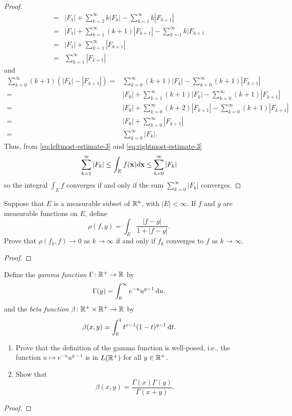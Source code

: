 \begin{proof}
\begin{equation}
\begin{aligned}
={}&|F_1|+\sum_{k=2}^\infty k|F_k|-\sum_{k=1}^\infty k|F_{k+1}|\\
={}&|F_1|+\sum_{k=1}^\infty(k+1)|F_{k+1}|-\sum_{k=1}^\infty k|F_{k+1}\\
={}&|F_1|+\sum_{k=1}^\infty |F_{k+1}|\\
={}&\sum_{k=1}^\infty|F_{k+1}|
\end{aligned}
\end{equation}
and
\begin{equation}
\label{eq:rightmost-estimate-3}
\begin{aligned}
\sum_{k=0}^\infty(k+1)\left(|F_k|-|F_{k+1}|\right)
={}&\sum_{k=0}^\infty(k+1)|F_k|-\sum_{k=0}^\infty(k+1)|F_{k+1}|\\
={}&|F_0|+\sum_{k=1}^\infty(k+1)|F_k|-\sum_{k=0}^\infty(k+1)|F_{k+1}|\\
={}&|F_0|+\sum_{k=0}^\infty(k+2)|F_{k+1}|-\sum_{k=0}^\infty(k+1)|F_{k+1}|\\
={}&|F_0|+\sum_{k=0}^\infty|F_{k+1}|\\
={}&\sum_{k=0}^\infty|F_k|.
\end{aligned}
\end{equation}
Thus, from \eqref{eq:leftmost-estimate-3} and
\eqref{eq:rightmost-estimate-3}
\begin{equation}
\label{eq:final-upper-lower-estimates-3}
\sum_{k=1}^\infty|F_k|\leq\int_E f(\mathbf{x}) d \mathbf{x}\leq\sum_{k=0}^\infty|F_k|
\end{equation}
so the integral $\int_E f$ converges if and only if the sum
$\sum_{k=0}^\infty|F_k|$ converges.
\end{proof}
\begin{problem}
Suppose that $E$ is a measurable subset of $\mathbb{R}^n$, with
$|E|<\infty$. If $f$ and $g$ are measurable functions on
$E$, define
\[
\rho(f,g)=\int_E\frac{|f-g|}{1+|f-g|}.
\]
Prove that $\rho(f_k,f)\to 0$ as $k\to\infty$ if and only if $f_k$
converges to $f$ as $k\to\infty$.
\end{problem}
\begin{proof}
\end{proof}

\begin{problem}
Define the \emph{gamma function} $\Gamma\colon\mathbb{R}^+\to\mathbb{R}$ by
\[
\Gamma(y)=\int_0^\infty e^{-u}u^{y-1}\mathop{}\!\mathrm{d} u,
\]
and the \emph{beta function} $\beta\colon\mathbb{R}^+\times\mathbb{R}^+\to\mathbb{R}$
by
\[
\beta(x,y)=\int_0^1 t^{x-1}(1-t)^{y-1}\mathop{}\!\mathrm{d} t.
\]
\begin{enumerate}[label=(\alph*)]
\item Prove that the definition of the gamma function is well-posed, i.e.,
the function $u\mapsto e^{-u}u^{y-1}$ is in $L(\mathbb{R}^+)$ for all
$y\in\mathbb{R}^+$.
\item Show that
\[
\beta(x,y)=\frac{\Gamma(x)\Gamma(y)}{\Gamma(x+y)}.
\]
\end{enumerate}
\end{problem}
\begin{proof}
\end{proof}

